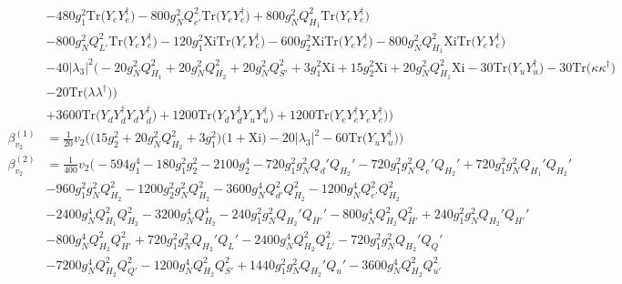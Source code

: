 {\begin{align}
 &-480 g_{1}^{2} \mbox{Tr}\Big({Y_e  Y_{e}^{\dagger}}\Big) -800 g_{N}^{2} Q_{e'}^{2} \mbox{Tr}\Big({Y_e  Y_{e}^{\dagger}}\Big) +800 g_{N}^{2} Q_{H_1}^{2} \mbox{Tr}\Big({Y_e  Y_{e}^{\dagger}}\Big) \nonumber \\ 
 &-800 g_{N}^{2} Q_{L'}^{2} \mbox{Tr}\Big({Y_e  Y_{e}^{\dagger}}\Big) -120 g_{1}^{2} \text{Xi} \mbox{Tr}\Big({Y_e  Y_{e}^{\dagger}}\Big) -600 g_{2}^{2} \text{Xi} \mbox{Tr}\Big({Y_e  Y_{e}^{\dagger}}\Big) -800 g_{N}^{2} Q_{H_1}^{2} \text{Xi} \mbox{Tr}\Big({Y_e  Y_{e}^{\dagger}}\Big) \nonumber \\ 
 &-40 |\lambda_3|^2 \Big(-20 g_{N}^{2} Q_{H_1}^{2} +20 g_{N}^{2} Q_{H_2}^{2} +20 g_{N}^{2} Q_{S'}^{2} +3 g_{1}^{2} \text{Xi} +15 g_{2}^{2} \text{Xi} +20 g_{N}^{2} Q_{H_1}^{2} \text{Xi} -30 \mbox{Tr}\Big({Y_u  Y_{u}^{\dagger}}\Big) -30 \mbox{Tr}\Big({\kappa  \kappa^{\dagger}}\Big) \nonumber \\ 
 &-20 \mbox{Tr}\Big({\lambda  \lambda^{\dagger}}\Big) \Big)\nonumber \\ 
 &+3600 \mbox{Tr}\Big({Y_d  Y_{d}^{\dagger}  Y_d  Y_{d}^{\dagger}}\Big) +1200 \mbox{Tr}\Big({Y_d  Y_{d}^{\dagger}  Y_u  Y_{u}^{\dagger}}\Big) +1200 \mbox{Tr}\Big({Y_e  Y_{e}^{\dagger}  Y_e  Y_{e}^{\dagger}}\Big) \Big)\\ 
\beta_{v_2}^{(1)} & =  
\frac{1}{20} v_2 \Big(\Big(15 g_{2}^{2}  + 20 g_{N}^{2} Q_{H_2}^{2}  + 3 g_{1}^{2} \Big)\Big(1 + \text{Xi}\Big) -20 |\lambda_3|^2  -60 \mbox{Tr}\Big({Y_u  Y_{u}^{\dagger}}\Big) \Big)\\ 
\beta_{v_2}^{(2)} & =  
\frac{1}{400} v_2 \Big(-594 g_{1}^{4} -180 g_{1}^{2} g_{2}^{2} -2100 g_{2}^{4} -720 g_{1}^{2} g_{N}^{2} Q_d' Q_{H_2}' -720 g_{1}^{2} g_{N}^{2} Q_e' Q_{H_2}' +720 g_{1}^{2} g_{N}^{2} Q_{H_1}' Q_{H_2}' \nonumber \\ 
 &-960 g_{1}^{2} g_{N}^{2} Q_{H_2}^{2} -1200 g_{2}^{2} g_{N}^{2} Q_{H_2}^{2} -3600 g_{N}^{4} Q_{d'}^{2} Q_{H_2}^{2} -1200 g_{N}^{4} Q_{e'}^{2} Q_{H_2}^{2} \nonumber \\ 
 &-2400 g_{N}^{4} Q_{H_1}^{2} Q_{H_2}^{2} -3200 g_{N}^{4} Q_{H_2}^{4} -240 g_{1}^{2} g_{N}^{2} Q_{H_2}' Q_{\bar{H}'}' -800 g_{N}^{4} Q_{H_2}^{2} Q_{\bar{H}'}^{2} +240 g_{1}^{2} g_{N}^{2} Q_{H_2}' Q_{H'}' \nonumber \\ 
 &-800 g_{N}^{4} Q_{H_2}^{2} Q_{H'}^{2} +720 g_{1}^{2} g_{N}^{2} Q_{H_2}' Q_L' -2400 g_{N}^{4} Q_{H_2}^{2} Q_{L'}^{2} -720 g_{1}^{2} g_{N}^{2} Q_{H_2}' Q_Q' \nonumber \\ 
 &-7200 g_{N}^{4} Q_{H_2}^{2} Q_{Q'}^{2} -1200 g_{N}^{4} Q_{H_2}^{2} Q_{S'}^{2} +1440 g_{1}^{2} g_{N}^{2} Q_{H_2}' Q_u' -3600 g_{N}^{4} Q_{H_2}^{2} Q_{u'}^{2} \nonumber \\ 

\end{align}}
